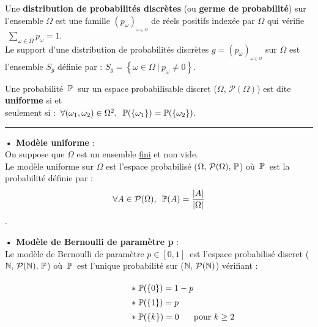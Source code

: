 \vspace{1.3cm}


Une \textbf{distribution de probabilités discrètes} (ou \textbf{germe de probabilité}) sur l'ensemble \(\Omega\) est une famille \((p_\omega)_{_{\omega \in \Omega}}\) de réels positifs indexée par \(\Omega\) qui vérifie \(\displaystyle\; \sum_{\omega \in \Omega}p_\omega=1.\)\vspace{0.2cm}\\
Le support d'une distribution de probabilités discrètes \(g=(p_\omega)_{_{\omega \in \Omega}}\) sur \(\Omega\) est l'ensemble \(S_g\) définie par : \(\displaystyle S_g=\left\{\omega \in \Omega \ \vert \ p_\omega \neq 0 \right\}.\)

\vspace{1.3cm}


Une probabilité \(\,\mathbb{P}\,\) sur un espace probabilisable discret (\(\Omega,\,\mathcal{P}(\Omega)\)) est dite \textbf{uniforme} si et\\
seulement si : \(\,\forall (\omega_1,\omega_2)\in \Omega^2,\ \, \mathbb{P}(\{\omega_1\})=\mathbb{P}(\{\omega_2\})\).
\vspace{1cm}
\hrule

\vspace{1cm}

\textbf{• Modèle uniforme} :\vspace{0.2cm}\\
On suppose que \(\Omega\) est un ensemble \underline{fini} et non vide.\\
Le modèle uniforme sur \(\Omega\) est l'espace probabilisé (\(\Omega,\,\mathcal{P}(\Omega),\,\mathbb{P}\)) où \(\,\mathbb{P}\,\) est la probabilité définie par :\vspace{-0.2cm}
\[\forall A\in \mathcal{P}(\Omega),\ \, \mathbb{P}(A)=\frac{|A|}{|\Omega|}\].
\vspace{0.4cm}

\textbf{• Modèle de Bernoulli de paramètre p} :\vspace{0.2cm}\\
Le modèle de Bernoulli de paramètre \(p\in [0,1]\,\) est l'espace probabilisé discret (\(\mathbb{N},\,\mathcal{P}(\mathbb{N}),\,\mathbb{P}\)) où \(\,\mathbb{P}\,\) est l'unique probabilité sur (\(\mathbb{N},\,\mathcal{P}(\mathbb{N})\)) vérifiant :\vspace{-0.3cm}

\[\hspace{2cm} \def\arraystretch{1.4} \arraycolsep=0.01cm
\begin{array}{ll}
    \ast \; \PP(\{0\})=1-p & \\
    \ast \; \PP(\{1\})=p & \\
    \ast \; \PP(\{k\})=0 & \text{pour } k\geq 2
\end{array}\]

